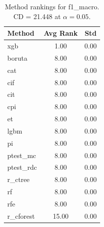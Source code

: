 \begin{table}[h]
\centering
\caption{Method rankings for f1_macro. CD = 21.448 at $\alpha=0.05$.}
\label{tab:ranks_f1_macro}
\begin{tabular}{lcc}
\toprule
Method & Avg Rank & Std \\
\midrule
xgb & 1.00 & 0.00 \\
boruta & 8.00 & 0.00 \\
cat & 8.00 & 0.00 \\
cif & 8.00 & 0.00 \\
cit & 8.00 & 0.00 \\
cpi & 8.00 & 0.00 \\
et & 8.00 & 0.00 \\
lgbm & 8.00 & 0.00 \\
pi & 8.00 & 0.00 \\
ptest_mc & 8.00 & 0.00 \\
ptest_rdc & 8.00 & 0.00 \\
r_ctree & 8.00 & 0.00 \\
rf & 8.00 & 0.00 \\
rfe & 8.00 & 0.00 \\
r_cforest & 15.00 & 0.00 \\
\bottomrule
\end{tabular}
\end{table}